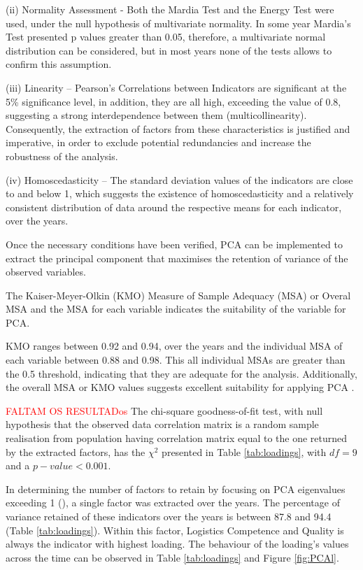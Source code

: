 \documentclass[sigconf]{acmart}
\begin{document}
(ii) Normality Assessment - Both the Mardia Test and the Energy Test were used, under the null hypothesis of multivariate normality.
In some year Mardia's Test presented p values greater than 0.05, therefore, a multivariate normal distribution can be considered, but in most years none of the tests allows to confirm this assumption.

(iii) Linearity -- Pearson's Correlations between Indicators are significant at the 5\% significance level, in addition, they are all high, exceeding the value of 0.8, suggesting a strong interdependence between them (multicollinearity).
Consequently, the extraction of factors from these characteristics is justified and imperative, in order to exclude potential redundancies and increase the robustness of the analysis.

(iv) Homoscedasticity -- The standard deviation values of the indicators are close to and below 1, which suggests the existence of homoscedasticity and a relatively consistent distribution of data around the respective means for each indicator, over the years.

Once the necessary conditions have been verified, PCA can be implemented to extract the principal component that maximises the retention of variance of the observed variables.

The Kaiser-Meyer-Olkin (KMO) Measure of Sample Adequacy (MSA) or Overal MSA and the MSA for each variable indicates the suitability of the variable for PCA. 

KMO ranges between 0.92 and 0.94, over the years
and the individual MSA of each variable between 0.88 and 0.98.
This all individual MSAs are greater than the 0.5 threshold, indicating that they are adequate for the analysis. Additionally, the overall MSA or KMO  values suggests excellent suitability for applying PCA \cite{maroco2018analise}. 


\textcolor{red}{FALTAM OS RESULTADos}
The chi-square goodness-of-fit test, with null hypothesis that the observed data correlation matrix  is a random sample realisation from population having correlation matrix equal to the one returned by the extracted factors, has the $\chi^2$ presented in Table \ref{tab:loadings}, with $df=9$ and a $p-value <0.001$.


In determining the number of factors to retain by focusing on PCA eigenvalues  exceeding 1 (\cite{carroll1978effect}), a single factor was extracted  over the years. The percentage of variance retained of these indicators over the years is between 87.8 and 94.4 (Table \ref{tab:loadings}). Within this factor,  Logistics Competence and Quality is always the indicator with highest loading. The behaviour of the loading's values across the time can be observed in Table \ref{tab:loadings} and Figure \ref{fig:PCAl}.
\end{document}
